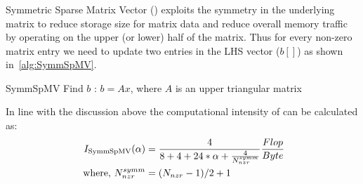 \begin{comment}
\subsubsection{\SpMTV}
Sparse Matrix Transpose Vector (\SpMTV) is a kernel having \DTWO dependency.
\begin{algorithm}[H]
	\caption{SpMTV Find $b$ : $b=A'x$} 
	\label{alg:SpMTV}
	\begin{algorithmic}[1]
		\FOR{$row=1:nrows$}
		\FOR{$idx=rowPtr[row]:rowPtr[row+1]$}
		\STATE{$b[col[idx]] += A[idx]*x[row]$} 
		\ENDFOR
		\ENDFOR
	\end{algorithmic}
\end{algorithm}
In comparison to SpMV operation, the kernel requires an extra scatter operation, which causes dependency. The arithmetic intensity of the kernel $I_\mathrm{\SpMTV}$ is given as:
\begin{equation}
\label{eq:SpMTV_intensity}
I_\mathrm{\SpMTV} (\alpha)= \frac{2}{8+4+16*\alpha+\frac{8}{\NNZRmath}} \\
\end{equation}
In ideal case data traffic for this kernel should remain close to that of SpMV, if \NNZR are sufficiently high, and $\alpha$ factor is small enough.
\end{comment}

\subsubsection{\SymmSpmv}
\label{sect:SymmSpmv}
Symmetric Sparse Matrix Vector (\SymmSpmv) exploits the symmetry in the underlying matrix to reduce storage size for matrix data and reduce overall memory traffic by  operating on the upper (or lower) half of the matrix. Thus for every non-zero matrix entry we need to update two entries in the LHS vector ($b[]$) as shown in~\cref{alg:SymmSpMV}.
\begin{algorithm}[H]
	\caption{SymmSpMV Find $b$ : $b=Ax$, where $A$ is an upper triangular matrix} 
	\label{alg:SymmSpMV}
	\begin{algorithmic}[1]
		\ENDFOR
		\ENDFOR
	\end{algorithmic}
\end{algorithm}
In line with the discussion above the computational intensity of \SymmSpmv can be calculated as:
\begin{align}
\label{eq:SymmSpMV_intensity}
I_\mathrm{\SymmSpmv} (\alpha) &= \frac{4}{8+4+24*\alpha+\frac{4}{\NNZRmathSYMM}} \frac{Flop}{Byte}\\
\label{eq:NNZR_symm}
\text{ where,  } \NNZRmathSYMM &= (\NNZRmath-1)/2 + 1
\end{align}

